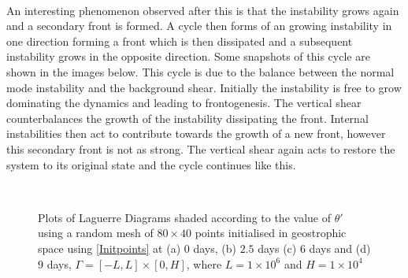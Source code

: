 \\
\linebreak
An interesting phenomenon observed after this is that the instability grows again and a secondary front is formed. A cycle then forms of an growing instability in one direction forming a front which is then dissipated and a subsequent instability grows in the opposite direction. Some snapshots of this cycle are shown in the images below. This cycle is due to the balance between the normal mode instability and the background shear. Initially the instability is free to grow dominating the dynamics and leading to frontogenesis. The vertical shear counterbalances the growth of the instability dissipating the front. Internal instabilities then act to contribute towards the growth of a new front, however this secondary front is not as strong. The vertical shear again acts to restore the system to its original state and the cycle continues like this. 
\newpage
\begin{figure}[ht!]
	\centering
	\\
	\caption{Plots of Laguerre Diagrams shaded according to the value of $\theta '$ using a random mesh of $80 \times 40$ points initialised in geostrophic space using \ref{Initpoints} at (a) $0$ days, (b) $2.5$ days (c) $6$ days and (d) $9$ days, $\Gamma = [-L,L]\times[0,H]$, where $L = 1\times10^6$ and $H = 1\times10^4$}
	\label{fig: thetap ldiag1}
\end{figure}

